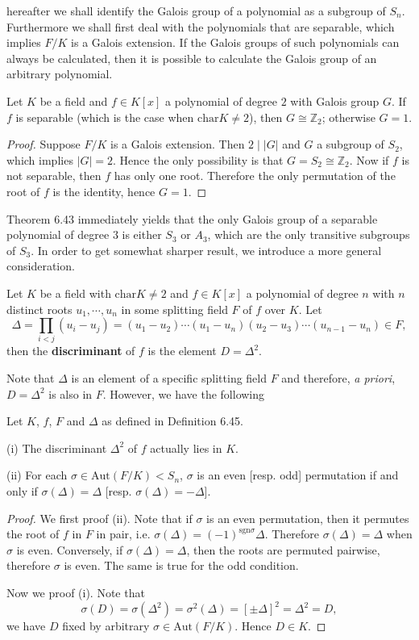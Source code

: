 hereafter we shall identify the Galois group of a polynomial as a subgroup of $S_n$. Furthermore we shall first deal with the polynomials that are separable, which implies $F/K$ is a Galois extension. If the Galois groups of such polynomials can always be calculated, then it is possible to calculate the Galois group of an arbitrary polynomial.
\begin{corollary}
Let $K$ be a field and $f\in K[x]$ a polynomial of degree $2$ with Galois group $G$. If $f$ is separable (which is the case when $\mathrm{char}K\ne 2$), then $G\cong\mathbb{Z}_2$; otherwise $G=1$.
\end{corollary}
\begin{proof}
Suppose $F/K$ is a Galois extension. Then $2\mid |G|$ and $G$ a subgroup of $S_2$, which implies $|G|=2$. Hence the only possibility is that $G=S_2\cong\mathbb{Z}_2$. Now if $f$ is not separable, then $f$ has only one root. Therefore the only permutation of the root of $f$ is the identity, hence $G=1$.
\end{proof}
Theorem 6.43 immediately yields that the only Galois group of a separable polynomial of degree $3$ is either $S_3$ or $A_3$, which are the only transitive subgroups of $S_3$. In order to get somewhat sharper result, we introduce a more general consideration.
\begin{definition}
Let $K$ be a field with $\mathrm{char}K\ne 2$ and $f\in K[x]$ a polynomial of degree $n$ with $n$ distinct roots $u_1,\cdots,u_n$ in some splitting field $F$ of $f$ over $K$. Let 
$$
\Delta =\prod_{i<j}{\left( u_i-u_j \right)}=\left( u_1-u_2 \right) \cdots \left( u_1-u_n \right) \left( u_2-u_3 \right) \cdots \left( u_{n-1}-u_n \right) \in F,
$$
then the \textbf{discriminant} of $f$ is the element $D=\Delta^2$.
\end{definition}
Note that $\Delta$ is an element of a specific splitting field $F$ and therefore, \textit{a priori}, $D=\Delta^2$ is also in $F$. However, we have the following
\begin{proposition}
Let $K$, $f$, $F$ and $\Delta$ as defined in Definition 6.45.\par
(i) The discriminant $\Delta^2$ of $f$ actually lies in $K$.\par
(ii) For each $\sigma\in\mathrm{Aut}(F/K)<S_n$, $\sigma$ is an even [resp. odd] permutation if and only if $\sigma(\Delta)=\Delta$ [resp. $\sigma(\Delta)=-\Delta$].
\end{proposition}
\begin{proof}
We first proof (ii). Note that if $\sigma$ is an even permutation, then it permutes the root of $f$ in $F$ in pair, i.e. $\sigma(\Delta)=(-1)^{\mathrm{sgn}\sigma}\Delta$. Therefore $\sigma(\Delta)=\Delta$ when $\sigma$ is even. Conversely, if $\sigma(\Delta)=\Delta$, then the roots are permuted pairwise, therefore $\sigma$ is even. The same is true for the odd condition.\par
Now we proof (i). Note that 
$$
\sigma \left( D \right) =\sigma \left( \Delta ^2 \right) =\sigma ^2\left( \Delta \right) =\left[ \pm \Delta \right] ^2=\Delta ^2=D,
$$
we have $D$ fixed by arbitrary $\sigma\in\mathrm{Aut}(F/K)$. Hence $D\in K$.
\end{proof}
